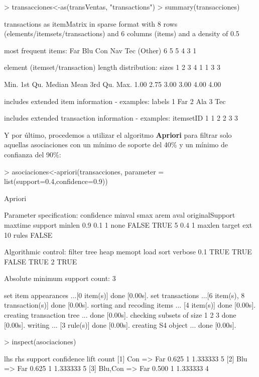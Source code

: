 \documentclass [a4paper] {article}
\begin{document}
\begin{Schunk}
\begin{Sinput}
> transacciones<-as(transVentas, "transactions")
> summary(transacciones)
\end{Sinput}
\begin{Soutput}
transactions as itemMatrix in sparse format with
 8 rows (elements/itemsets/transactions) and
 6 columns (items) and a density of 0.5 

most frequent items:
    Far     Blu     Con     Nav     Tec (Other) 
      6       5       5       4       3       1 

element (itemset/transaction) length distribution:
sizes
1 2 3 4 
1 1 3 3 

   Min. 1st Qu.  Median    Mean 3rd Qu.    Max. 
   1.00    2.75    3.00    3.00    4.00    4.00 

includes extended item information - examples:
  labels
1    Far
2    Ala
3    Tec

includes extended transaction information - examples:
  itemsetID
1         1
2         2
3         3
\end{Soutput}
\end{Schunk}

Y por último, procedemos a utilizar el algoritmo \textbf{Apriori}
para filtrar solo aquellas asociaciones con un mínimo de soporte
del 40\% y un mínimo de confianza del 90\%:

\begin{Schunk}
\begin{Sinput}
> asociaciones<-apriori(transacciones, parameter = list(support=0.4,confidence=0.9))
\end{Sinput}
\begin{Soutput}
Apriori

Parameter specification:
 confidence minval smax arem  aval originalSupport maxtime support minlen
        0.9    0.1    1 none FALSE            TRUE       5     0.4      1
 maxlen target   ext
     10  rules FALSE

Algorithmic control:
 filter tree heap memopt load sort verbose
    0.1 TRUE TRUE  FALSE TRUE    2    TRUE

Absolute minimum support count: 3 

set item appearances ...[0 item(s)] done [0.00s].
set transactions ...[6 item(s), 8 transaction(s)] done [0.00s].
sorting and recoding items ... [4 item(s)] done [0.00s].
creating transaction tree ... done [0.00s].
checking subsets of size 1 2 3 done [0.00s].
writing ... [3 rule(s)] done [0.00s].
creating S4 object  ... done [0.00s].
\end{Soutput}
\begin{Sinput}
> inspect(asociaciones)
\end{Sinput}
\begin{Soutput}
    lhs          rhs   support confidence lift     count
[1] {Con}     => {Far} 0.625   1          1.333333 5    
[2] {Blu}     => {Far} 0.625   1          1.333333 5    
[3] {Blu,Con} => {Far} 0.500   1          1.333333 4    
\end{Soutput}
\end{Schunk}
\end{document}
